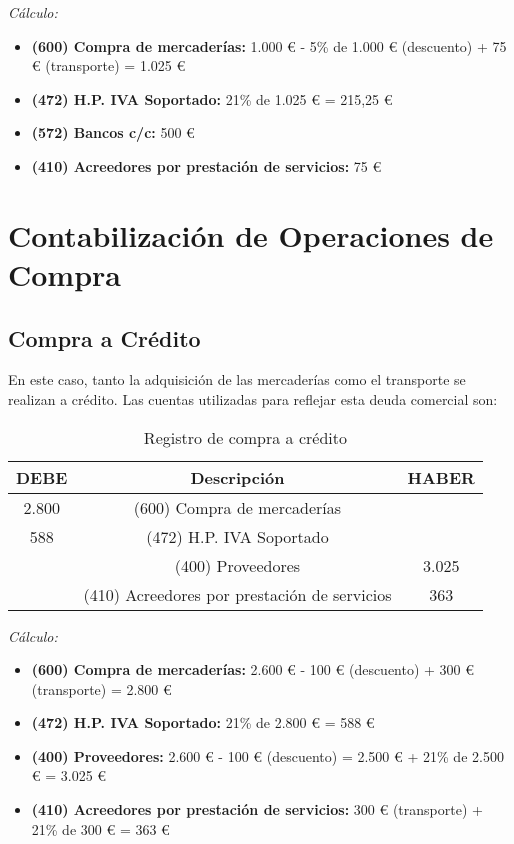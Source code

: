 \documentclass{article}
\begin{document}
\textit{Cálculo:}
\begin{itemize}
    \item \textbf{(600) Compra de mercaderías:} 1.000 € - 5\% de 1.000 € (descuento) + 75 € (transporte) = 1.025 €
    \item \textbf{(472) H.P. IVA Soportado:} 21\% de 1.025 € = 215,25 €
    \item \textbf{(572) Bancos c/c:} 500 €
    \item \textbf{(410) Acreedores por prestación de servicios:} 75 €
\end{itemize}

\section*{Contabilización de Operaciones de Compra}

\subsection*{Compra a Crédito}
En este caso, tanto la adquisición de las mercaderías como el transporte se realizan a crédito. Las cuentas utilizadas para reflejar esta deuda comercial son:

\begin{table}[H]
\centering
\begin{tabular}{|c|c|c|}
\hline
\textbf{DEBE} & \textbf{Descripción} & \textbf{HABER} \\
\hline
2.800 & (600) Compra de mercaderías & \\
588 & (472) H.P. IVA Soportado & \\
 & (400) Proveedores & 3.025 \\
 & (410) Acreedores por prestación de servicios & 363 \\
\hline
\end{tabular}
\caption{Registro de compra a crédito}
\end{table}

\textit{Cálculo:}
\begin{itemize}
    \item \textbf{(600) Compra de mercaderías:} 2.600 € - 100 € (descuento) + 300 € (transporte) = 2.800 €
    \item \textbf{(472) H.P. IVA Soportado:} 21\% de 2.800 € = 588 €
    \item \textbf{(400) Proveedores:} 2.600 € - 100 € (descuento) = 2.500 € + 21\% de 2.500 € = 3.025 €
    \item \textbf{(410) Acreedores por prestación de servicios:} 300 € (transporte) + 21\% de 300 € = 363 €
\end{itemize}
\end{document}
